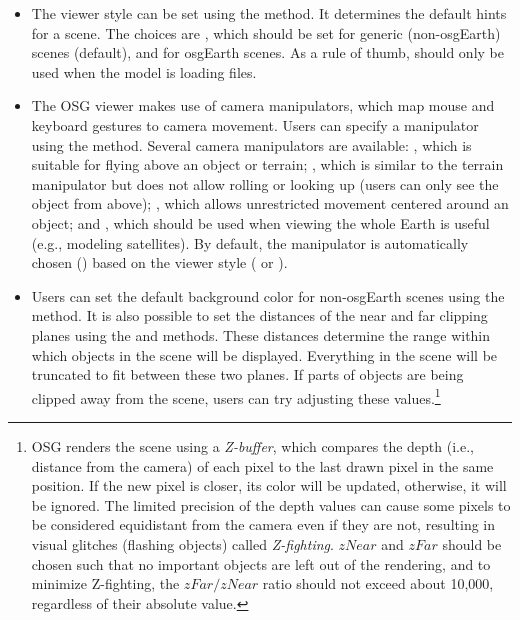 \begin{itemize}

  \item {} The viewer style can be set using the
     method. It determines the default hints for a
    scene. The choices are , which should be set for generic
    (non-osgEarth) scenes (default), and  for osgEarth scenes.
    As a rule of thumb,  should only be used when the model is
    loading  files.

  \item {} The OSG viewer makes use of camera
    manipulators, which map mouse and keyboard gestures to camera movement.
    Users can specify a manipulator using the 
    method. Several camera manipulators are available: , which
    is suitable for flying above an object or terrain; , which
    is similar to the terrain manipulator but does not allow rolling or looking
    up (users can only see the object from above); , which
    allows unrestricted movement centered around an object; and ,
    which should be used when viewing the whole Earth is useful (e.g., modeling
    satellites). By default, the manipulator is automatically chosen
    () based on the viewer style ( or
    ).

  \item {} Users can set the default background color for
    non-osgEarth scenes using the  method. It is also
    possible to set the distances of the near and far clipping planes using the
     and  methods. These distances determine
    the range within which objects in the scene will be displayed. Everything in the
    scene will be truncated to fit between these two planes. If parts of
    objects are being clipped away from the scene, users can try adjusting these
    values.\footnote{OSG renders the scene using a \textit{Z-buffer}, which
    compares the depth (i.e., distance from the camera) of each pixel to the
    last drawn pixel in the same position. If the new pixel is closer, its color
    will be updated, otherwise, it will be ignored. The limited precision of the
    depth values can cause some pixels to be considered equidistant from the
    camera even if they are not, resulting in visual glitches (flashing objects) called
    \textit{Z-fighting}. $zNear$ and $zFar$ should be chosen such that no
    important objects are left out of the rendering, and to minimize Z-fighting,
    the $zFar/zNear$ ratio should not exceed about 10,000, regardless of their absolute value.}


\end{itemize}
